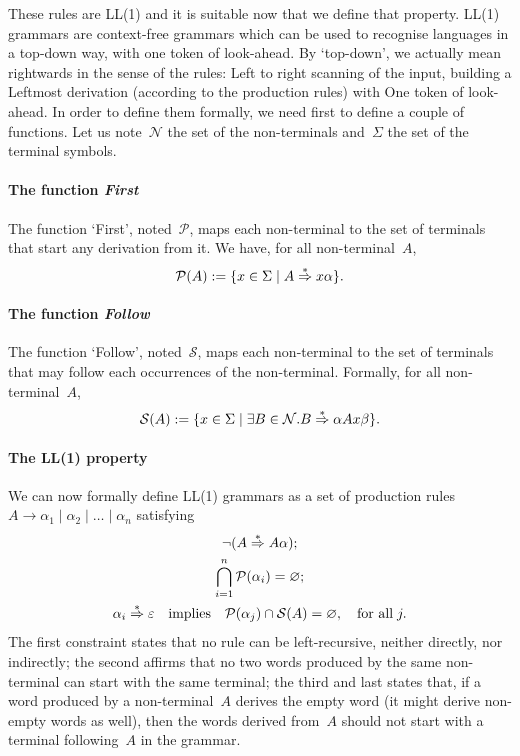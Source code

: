 These rules are LL(1) and it is suitable now that we define that
property. LL(1) grammars are context\hyp{}free grammars which can be
used to recognise languages in a top\hyp{}down way, with one token of
look\hyp{}ahead. By `top\hyp{}down', we actually mean rightwards in
the sense of the rules: Left to right scanning of the input, building
a Leftmost derivation (according to the production rules) with One
token of look\hyp{}ahead. In order to define them formally, we need
first to define a couple of functions. Let us note~\(\mathcal{N}\) the
set of the non\hyp{}terminals and~\(\Sigma\) the set of the terminal
symbols.

\paragraph{The function \emph{First}}

The function `First', noted~\(\mathcal{P}\), maps each
non\hyp{}terminal to the set of terminals that start any derivation
from it. We have, for all non\hyp{}terminal~\(A\),
\begin{equation*}
\mathcal{P}(A) := \{ x \in \Sigma \mid A \stackrel{*}{\Rightarrow} x
\alpha\}.
\end{equation*}

\paragraph{The function \emph{Follow}}

The function `Follow', noted~\(\mathcal{S}\), maps each
non\hyp{}terminal to the set of terminals that may follow each
occurrences of the non\hyp{}terminal. Formally, for all
non\hyp{}terminal~\(A\),
\begin{equation*}
\mathcal{S}(A) := \{x \in \Sigma \mid \exists B \in \mathcal{N}.B
\stackrel{*}{\Rightarrow} \alpha A x \beta\}.
\end{equation*}

\paragraph{The LL(1) property}

We can now formally define LL(1) grammars as a set of production rules
\(A \rightarrow \alpha_1 \mid \alpha_2 \mid \ldots \mid \alpha_n\)
satisfying
\begin{gather}
\neg(A \stackrel{*}{\Rightarrow} A \alpha);\label{P1}\\
\bigcap_{i=1}^{n} \mathcal{P}(\alpha_i) = \varnothing;\label{P2}\\
\alpha_i \stackrel{*}{\Rightarrow} \varepsilon \quad \text{implies} \quad
\mathcal{P}(\alpha_j) \cap \mathcal{S}(A) = \varnothing, \quad \text{for all}
\; j.\label{P3}
\end{gather}
The first constraint states that no rule can be left\hyp{}recursive,
neither directly, nor indirectly; the second affirms that no two words
produced by the same non\hyp{}terminal can start with the same
terminal; the third and last states that, if a word produced by a
non\hyp{}terminal~\(A\) derives the empty word (it might derive
non\hyp{}empty words as well), then the words derived from~\(A\)
should not start with a terminal following~\(A\) in the grammar.

